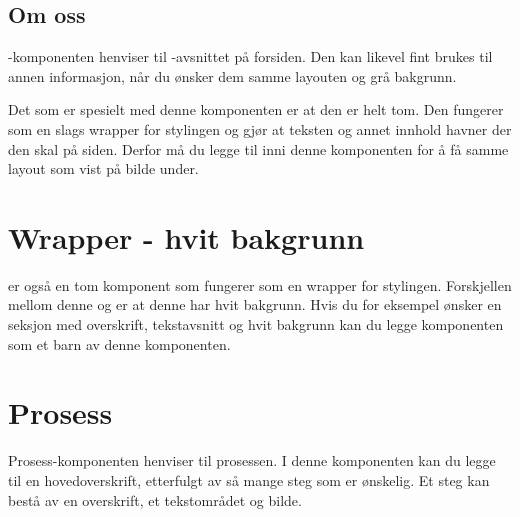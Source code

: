 \subsection{Om oss}
-komponenten henviser til -avsnittet på forsiden. Den kan likevel fint brukes til annen informasjon, når du ønsker dem samme layouten og grå bakgrunn.

Det som er spesielt med denne komponenten er at den er helt tom. Den fungerer som en slags wrapper for stylingen og gjør at teksten og annet innhold havner der den skal på siden. Derfor må du legge til  inni denne komponenten for å få samme layout som vist på bilde under.

\begin{figure}[H]
    \centering
    \label{fig:cms-about-us}
\end{figure}

\section{Wrapper - hvit bakgrunn}
 er også en tom komponent som fungerer som en wrapper for stylingen. Forskjellen mellom denne og  er at denne har hvit bakgrunn. Hvis du for eksempel ønsker en seksjon med overskrift, tekstavsnitt og hvit bakgrunn kan du legge komponenten  som et barn av denne komponenten.

\section{Prosess}
Prosess-komponenten henviser til prosessen. I denne komponenten kan du legge til en hovedoverskrift, etterfulgt av så mange steg som er ønskelig. Et steg kan bestå av en overskrift, et tekstområdet og bilde. 

